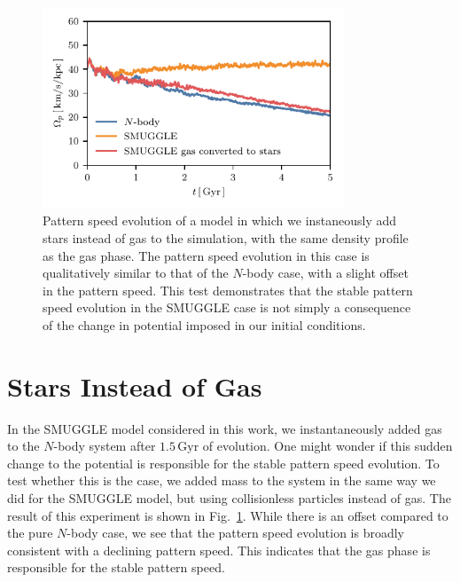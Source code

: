 \documentclass[twocolumn,linenumbers,trackchanges]{aastex631}
\begin{document}
\begin{figure}
    \centering
    \includegraphics[width=9cm]{fig/ps_star.pdf}
    \caption{Pattern speed evolution of a model in which we instaneously
    add stars instead of gas to the simulation, with the same density profile as
    the gas phase. The pattern speed evolution in this case is qualitatively
    similar to that of the $N$-body case, with a slight offset in the pattern
    speed. This test demonstrates that the stable pattern speed evolution in the
    SMUGGLE case is not simply a consequence of the change in potential imposed
    in our initial conditions.}
\label{fig:ps-star}
\end{figure}

\section{Stars Instead of Gas}
In the SMUGGLE model considered in this work, we instantaneously added gas to
the $N$-body system after $1.5\,\textrm{Gyr}$ of evolution. One might wonder if
this sudden change to the potential is responsible for the stable pattern speed
evolution. To test whether this is the case, we added mass to the system in the
same way we did for the SMUGGLE model, but using collisionless particles instead
of gas. The result of this experiment is shown in Fig.~\ref{fig:ps-star}. While
there is an offset compared to the pure $N$-body case, we see that the pattern
speed evolution is broadly consistent with a declining pattern speed. This
indicates that the gas phase is responsible for the stable pattern speed.
\end{document}
